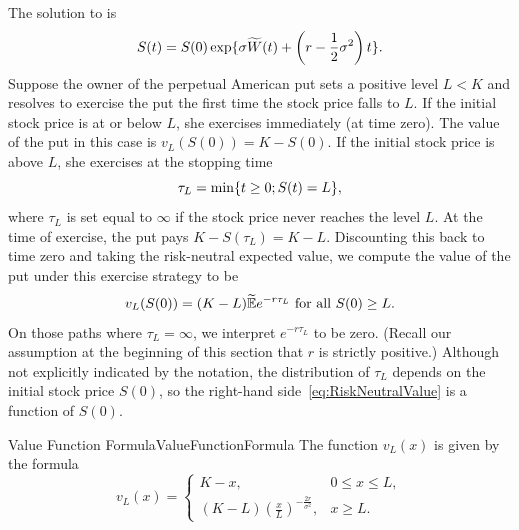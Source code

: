 The solution to  is
\begin{equation} \label{eq:StockPriceSolution}
	S(t) = S(0) \exp \{ \sigma \widetilde{W}(t) + \left( r - \frac{1}{2}\sigma^2 \right) t \}.
\end{equation}
Suppose the owner of the perpetual American put sets a positive level \(L < K\) and resolves to exercise the put the first time the stock price falls to \(L\). If the initial stock price is at or below \(L\), she exercises immediately (at time zero). The value of the put in this case is \(v_L(S(0)) = K - S(0)\). If the initial stock price is above \(L\), she exercises at the stopping time
\begin{equation} \label{eq:StoppingTime}
	\tau_L = \min\{t \ge 0; S(t) = L\},
\end{equation}
where \(\tau_L\) is set equal to \(\infty\) if the stock price never reaches the level \(L\). At the time of exercise, the put pays \(K - S(\tau_L) = K - L\). Discounting this back to time zero and taking the risk-neutral expected value, we compute the value of the put under this exercise strategy to be
\begin{equation} \label{eq:RiskNeutralValue}
	v_L(S(0)) = (K - L) \widetilde{\mathbb{E}}e^{-r\tau_L} \text{ for all } S(0) \ge L.
\end{equation}
On those paths where \(\tau_L = \infty\), we interpret \(e^{-r\tau_L}\) to be zero. (Recall our assumption at the beginning of this section that \(r\) is strictly positive.) Although not explicitly indicated by the notation, the distribution of \(\tau_L\) depends on the initial stock price \(S(0)\), so the right-hand side~\eqref{eq:RiskNeutralValue} is a function of \(S(0)\).

\begin{lem}{Value Function Formula}{ValueFunctionFormula}
	The function \(v_L(x)\) is given by the formula
	\begin{equation} \label{eq:ValueFunctionPiecewise}
		v_L(x) = \begin{cases}
			K - x,                                                     & 0 \le x \le L, \\
			(K - L) \left( \frac{x}{L} \right)^{-\frac{2r}{\sigma^2}}, & x \ge L.
		\end{cases}
	\end{equation}
\end{lem}

